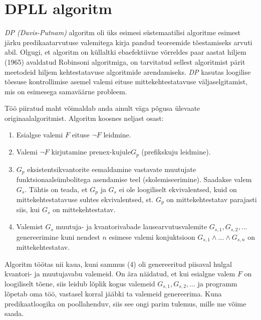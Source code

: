 \chapter{DPLL algoritm}

\textit{DP (Davis-Putnam)} algoritm \cite{davis60} oli üks esimesi
süstemaatilisi algoritme esimest järku predikaatarvutuse valemitega kirja pandud teoreemide
tõestamiseks arvuti abil. Olgugi, et algoritm on küllaltki ebaefektiivne võrreldes
paar aastat hiljem (1965) avaldatud Robinsoni algoritmiga, on tarvitatud sellest
algoritmist pärit meetodeid hiljem kehtestatavuse algoritmide arendamiseks.
\textit{DP} kasutas loogilise tõesuse kontrollimise asemel valemi eituse
mittekehtestatavuse väljaselgitamist, mis on esimesega samaväärne probleem.

Töö piiratud maht võimaldab anda ainult väga põgusa ülevaate
originaalalgoritmist. Algoritm koosnes neljast osast:

\begin{enumerate}
  \item Esialgse valemi $F$ eituse $\neg F$ leidmine.
  \item Valemi $\neg F$ kirjutamine prenex-kujule\footnotemark[2] $G_p$
  (prefikskuju leidmine).
  \item $G_p$ eksistentsikvantorite eemaldamine
  vastavate muutujate funktsionaalsümbolitega asendamise teel
  (skolemiseerimine\footnotemark[2]). Saadakse valem $G_s$. Tähtis on teada,
  et $G_p$ ja $G_s$ ei ole loogiliselt ekvivalentsed, kuid on mittekehtestatavuse suhtes ekvivalentsed, st. $G_p$ on mittekehtestatav parajasti siis, kui $G_s$ on mittekehtestatav.
  \item Valemist $G_s$ muutuja- ja kvantorivabade lausearvutusvalemite
  $G_{s,1},G_{s,2},\dots$ genereerimine kuni nendest $n$ esimese valemi
  konjuktsioon $G_{s,1}\wedge\dots\wedge G_{s,n}$ on mittekehtestatav. 
\end{enumerate}


Algoritm töötas nii kaua, kuni sammus (4) oli genereeritud piisaval hulgal
kvantori- ja muutujavabu valemeid. On ära näidatud, et kui esialgne valem $F$
on loogiliselt tõene, siis leidub lõplik kogus valemeid $G_{s,1},G_{s,2},\dots$
ja programm lõpetab oma töö, vastasel korral jääbki ta valemeid genereerima.
Kuna predikaatloogika on poollahenduv, siis see ongi parim tulemus, mille me
võime saada.

